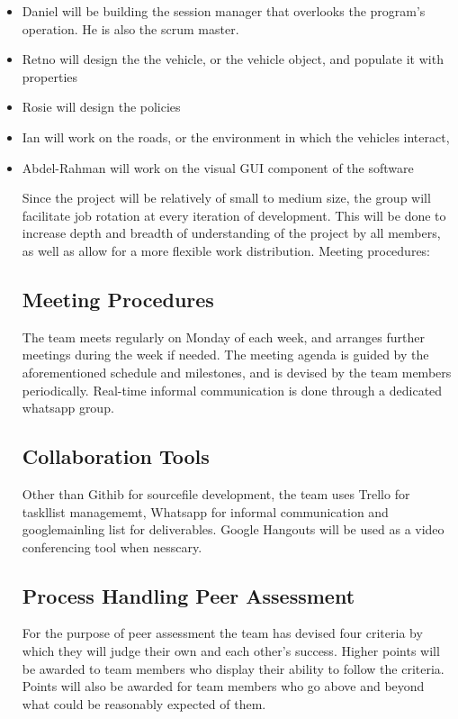 \documentclass[11pt]{article}
\begin{document}
	\begin{itemize}
		\item Daniel will be building the session manager that overlooks the program’s operation. He is also the scrum master.
		\item Retno will design the the vehicle, or the vehicle object, and populate it with properties
		\item Rosie will design the policies
		\item Ian will work on the roads, or the environment in which the vehicles interact,
		\item Abdel-Rahman will work on the visual GUI component of the software

Since the project will be relatively of small to medium size, the group will facilitate job rotation at every iteration of development. This will be done to increase depth and breadth of understanding of the project by all members, as well as allow for a more flexible work distribution. 
Meeting procedures:
\subsection{Meeting Procedures}


The team meets regularly on Monday of each week, and arranges further meetings during the week if needed. The meeting agenda is guided by the aforementioned schedule and milestones, and is devised by the team members periodically. Real-time informal communication is done through a dedicated whatsapp group.

\subsection{Collaboration Tools}

Other than Githib for sourcefile development, the team uses Trello for taskllist managememt, Whatsapp for informal communication and googlemainling list for deliverables. Google Hangouts will be used as a video conferencing tool when nesscary.


\subsection{Process Handling Peer Assessment}
For the purpose of peer assessment the team has devised four criteria by which they will judge their own
and each other's success. Higher points will be awarded to team members who display their ability to follow the criteria. Points will also be awarded for team members who go above and beyond what could be reasonably expected of them.


\end{itemize}
\end{document}
